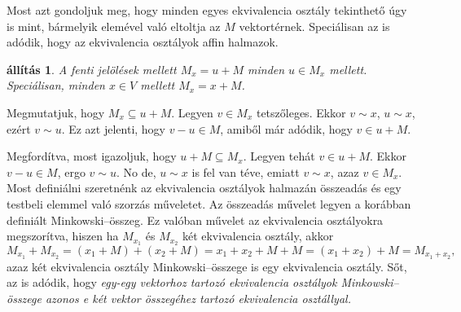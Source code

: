 \documentclass[a4paper, showtrims]{memoir}
\makeatletter
\renewenvironment{proof}[1][\proofname]
    {\par\pushQED{\qed}%
    \normalfont \topsep6\p@\@plus6\p@\relax
    \trivlist
    \item[\hskip\labelsep
        \itshape
    #1\@addpunct{:}]\ignorespaces}
    {\popQED\endtrivlist\@endpefalse}
\theoremstyle{plain}
\newtheorem{proposition}{állítás}[chapter]
\theoremstyle{remark}
\theoremstyle{definition}
\makeatother
\begin{document}
Most azt gondoljuk meg, hogy minden egyes ekvivalencia osztály tekinthető úgy is mint,
bármelyik elemével való eltoltja az $M$ vektortérnek.
Speciálisan az is adódik,
hogy az ekvivalencia osztályok affin halmazok.
\begin{proposition}
	A fenti jelölések mellett $M_x=u+M$ minden $u\in M_x$ mellett.
	Speciálisan, minden $x\in V$ mellett $M_x=x+M$.
\end{proposition}
\begin{proof}
	Megmutatjuk, hogy $M_x\subseteq u+M$.
	Legyen $v\in M_x$ tetszőleges.
	Ekkor $v\sim x$, $u\sim x$, ezért $v\sim u$.
	Ez azt jelenti, hogy $v-u\in M$, amiből már adódik,
	hogy $v\in u+M$.

	Megfordítva, most igazoljuk, hogy $u+M\subseteq M_x$.
	Legyen tehát $v\in u+M$.
	Ekkor $v-u\in M$, ergo $v\sim u$.
	No de, $u\sim x$ is fel van téve,
	emiatt $v\sim x$, azaz $v\in M_x$.
\end{proof}
Most definiálni szeretnénk az ekvivalencia osztályok halmazán összeadás és egy testbeli elemmel való
szorzás műveletet.
Az összeadás művelet legyen a korábban definiált Minkowski--összeg.
Ez valóban művelet az ekvivalencia osztályokra megszorítva,
hiszen ha $M_{x_1}$ és $M_{x_2}$ két ekvivalencia osztály,
akkor
\[
	M_{x_1}+M_{x_2}=\left( x_1+M \right)+\left( x_2+M \right)
	=
	x_1+x_2+M+M=
	\left( x_1+x_2 \right)+M
	=
	M_{x_1+x_2},\tag{\dag}
\]
azaz két ekvivalencia osztály Minkowski--összege is egy ekvivalencia osztály.
Sőt, az is adódik, hogy
\emph{
	egy-egy vektorhoz tartozó ekvivalencia osztályok Minkowski--összege
	azonos e két vektor összegéhez tartozó ekvivalencia osztállyal.}
\end{document}
